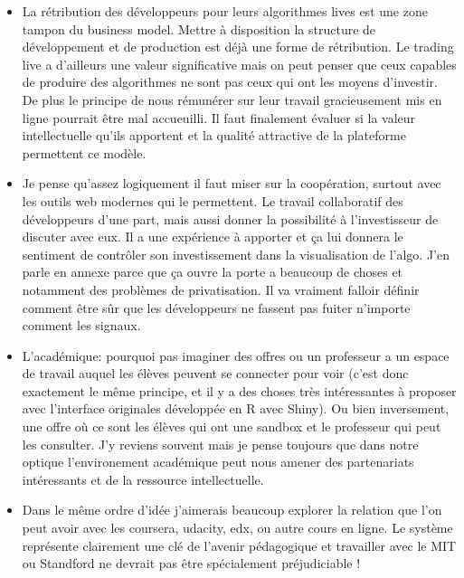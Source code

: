 \begin{itemize}

    \item La rétribution des développeurs pour leurs algorithmes lives est une
    zone tampon du business model. Mettre à disposition la structure de
    développement et de production est déjà une forme de rétribution. Le
    trading live a d'ailleurs une valeur significative mais on peut penser que ceux
    capables de produire des algorithmes ne sont pas ceux qui ont les moyens d'investir. 
    De plus le principe de nous rémunérer sur leur travail
    gracieusement mis en ligne pourrait être mal accueuilli. Il faut finalement
    évaluer si la valeur intellectuelle qu'ils apportent et la qualité
    attractive de la plateforme permettent ce modèle.\newline

    \item Je pense qu'assez logiquement il faut miser sur la coopération,
    surtout avec les outils web modernes qui le permettent.
    Le travail collaboratif des développeurs d'une part, mais aussi donner 
    la possibilité à l'investisseur de  discuter avec eux. Il a une expérience à
    apporter et ça lui donnera le sentiment de contrôler son investissement
    dans la visualisation de l'algo. J'en parle en annexe parce que ça ouvre la
    porte a beaucoup de choses et notamment des problèmes de privatisation. Il
    va vraiment falloir définir comment être sûr que les développeurs ne
    fassent pas fuiter n'importe comment les signaux.\newline

    \item L'académique: pourquoi pas imaginer des offres ou un professeur a un
    espace de travail auquel les élèves peuvent se connecter pour voir (c'est
    donc exactement le même principe, et il y a des choses très intéressantes à
    proposer avec l'interface originales développée en R avec Shiny). 
    Ou bien inversement, une offre où ce sont
    les élèves qui ont une sandbox et le professeur qui peut les consulter. J'y
    reviens souvent mais je pense toujours que dans notre optique
    l'environement académique peut nous amener des partenariats intéressants et
    de la ressource intellectuelle.\newline

    \item Dans le même ordre d'idée j'aimerais beaucoup explorer la relation
    que l'on peut avoir avec les coursera, udacity, edx, ou autre cours en
    ligne. Le système représente clairement une clé de l'avenir pédagogique et
    travailler avec le MIT ou Standford ne devrait pas être spécialement
    préjudiciable !\newline


\end{itemize}
